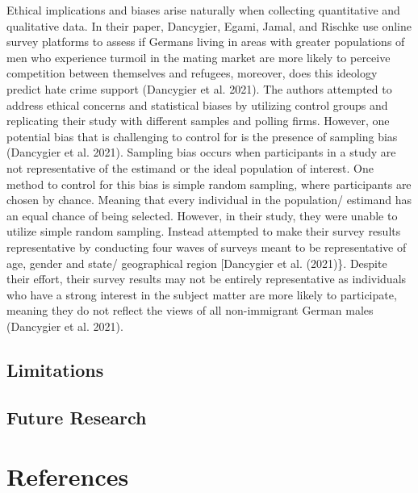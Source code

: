 \documentclass[
]{article}
\begin{document}
Ethical implications and biases arise naturally when collecting
quantitative and qualitative data. In their paper, Dancygier, Egami,
Jamal, and Rischke use online survey platforms to assess if Germans
living in areas with greater populations of men who experience turmoil
in the mating market are more likely to perceive competition between
themselves and refugees, moreover, does this ideology predict hate crime
support (Dancygier et al. 2021). The authors attempted to address
ethical concerns and statistical biases by utilizing control groups and
replicating their study with different samples and polling firms.
However, one potential bias that is challenging to control for is the
presence of sampling bias (Dancygier et al. 2021). Sampling bias occurs
when participants in a study are not representative of the estimand or
the ideal population of interest. One method to control for this bias is
simple random sampling, where participants are chosen by chance. Meaning
that every individual in the population/ estimand has an equal chance of
being selected. However, in their study, they were unable to utilize
simple random sampling. Instead attempted to make their survey results
representative by conducting four waves of surveys meant to be
representative of age, gender and state/ geographical region
{[}Dancygier et al. (2021)\}. Despite their effort, their survey results
may not be entirely representative as individuals who have a strong
interest in the subject matter are more likely to participate, meaning
they do not reflect the views of all non-immigrant German males
(Dancygier et al. 2021).

\hypertarget{limitations}{%
\subsection{Limitations}\label{limitations}}

\hypertarget{future-research}{%
\subsection{Future Research}\label{future-research}}

\clearpage

\hypertarget{references}{%
\section*{References}\label{references}}
\end{document}
